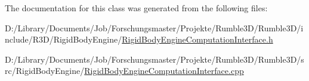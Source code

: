 The documentation for this class was generated from the following files\+:\begin{DoxyCompactItemize}
\item 
D\+:/\+Library/\+Documents/\+Job/\+Forschungsmaster/\+Projekte/\+Rumble3\+D/\+Rumble3\+D/include/\+R3\+D/\+Rigid\+Body\+Engine/\mbox{\hyperlink{_rigid_body_engine_computation_interface_8h}{Rigid\+Body\+Engine\+Computation\+Interface.\+h}}\item 
D\+:/\+Library/\+Documents/\+Job/\+Forschungsmaster/\+Projekte/\+Rumble3\+D/\+Rumble3\+D/src/\+Rigid\+Body\+Engine/\mbox{\hyperlink{_rigid_body_engine_computation_interface_8cpp}{Rigid\+Body\+Engine\+Computation\+Interface.\+cpp}}\end{DoxyCompactItemize}
